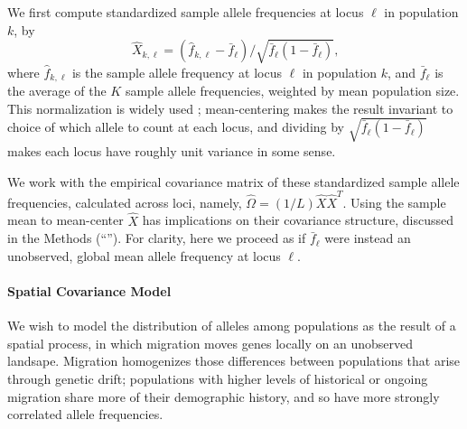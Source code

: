 \documentclass[12pt]{article}
\newcommand{\secref}[1]{``\nameref{#1}''}
\begin{document}
We first compute standardized sample allele frequencies at locus $\ell$ in population $k$, by
\begin{equation}
  \label{eq:standardized_sample_freqs}
  \hat{X}_{k,\ell} = (\hat{f}_{k,\ell}  - \bar{f}_{\ell})/\sqrt{\bar{f}_{\ell}(1-\bar{f}_{\ell})}\text{,}
\end{equation}
where $\hat{f}_{k,\ell}$ is the sample allele frequency at locus $\ell$ in population $k$, 
and $\bar{f}_{\ell}$ is the average of the $K$ sample allele frequencies,
weighted by mean population size.
This normalization is widely used \citep[e.g.][]{nicholson2002,Patterson2006};
mean-centering makes the result invariant to choice of which allele to count at each locus,
and dividing by $\sqrt{\bar{f}_{\ell}(1-\bar{f}_{\ell})}$ makes each locus have roughly unit variance in some sense.

We work with the empirical covariance matrix of these standardized sample allele frequencies,
calculated across loci, namely, $\widehat{\Omega} = (1/L)  \hat{X}\hat{X}^T$.
Using the sample mean to mean-center $\hat X$ has implications on their covariance structure, discussed in the Methods 
(\secref{ss:cov_methods}).
For clarity, here we proceed as if $\bar{f}_{\ell}$ were instead an unobserved, global mean allele frequency at locus $\ell$.

\paragraph{Spatial Covariance Model}
We wish to model the distribution of alleles among populations as the result of a spatial process, 
in which migration moves genes locally on an unobserved landsape.
Migration homogenizes those differences between populations that arise through genetic drift;
populations with higher levels of historical or ongoing migration share more of their demographic history,
and so have more strongly correlated allele frequencies.
\end{document}

